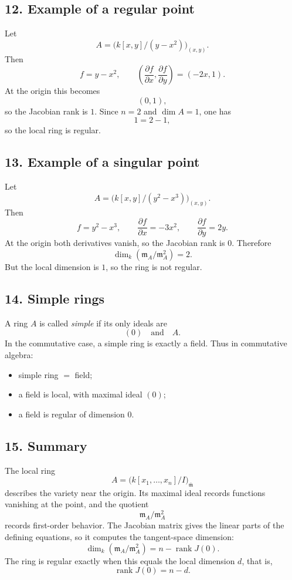 \documentclass[12pt,a4paper]{article}
\theoremstyle{plain}
\theoremstyle{definition}      %
\begin{document}
	\subsection*{12. Example of a regular point}
	
	Let
	\[
	A=\bigl(k[x,y]/(y-x^2)\bigr)_{(x,y)}.
	\]
	Then
	\[
	f=y-x^2,
	\qquad
	\left(\frac{\partial f}{\partial x},\frac{\partial f}{\partial y}\right)=(-2x,1).
	\]
	At the origin this becomes
	\[
	(0,1),
	\]
	so the Jacobian rank is \(1\). Since \(n=2\) and \(\dim A=1\), one has
	\[
	1=2-1,
	\]
	so the local ring is regular.
	
	\subsection*{13. Example of a singular point}
	
	Let
	\[
	A=\bigl(k[x,y]/(y^2-x^3)\bigr)_{(x,y)}.
	\]
	Then
	\[
	f=y^2-x^3,
	\qquad
	\frac{\partial f}{\partial x}=-3x^2,\qquad \frac{\partial f}{\partial y}=2y.
	\]
	At the origin both derivatives vanish, so the Jacobian rank is \(0\). Therefore
	\[
	\dim_k(\mathfrak m_A/\mathfrak m_A^2)=2.
	\]
	But the local dimension is \(1\), so the ring is not regular.
	
	\subsection*{14. Simple rings}
	
	A ring \(A\) is called \emph{simple} if its only ideals are
	\[
	(0)\quad\text{and}\quad A.
	\]
	In the commutative case, a simple ring is exactly a field. Thus in commutative algebra:
	\begin{itemize}
		\item simple ring \(=\) field;
		\item a field is local, with maximal ideal \((0)\);
		\item a field is regular of dimension \(0\).
	\end{itemize}
	
	\subsection*{15. Summary}
	
	The local ring
	\[
	A=\bigl(k[x_1,\dots,x_n]/I\bigr)_{\bar{\mathfrak m}}
	\]
	describes the variety near the origin. Its maximal ideal records functions vanishing at the point, and the quotient
	\[
	\mathfrak m_A/\mathfrak m_A^2
	\]
	records first-order behavior. The Jacobian matrix gives the linear parts of the defining equations, so it computes the tangent-space dimension:
	\[
	\dim_k(\mathfrak m_A/\mathfrak m_A^2)=n-\operatorname{rank}J(0).
	\]
	The ring is regular exactly when this equals the local dimension \(d\), that is,
	\[
	\operatorname{rank}J(0)=n-d.
	\]
	
\end{document}
